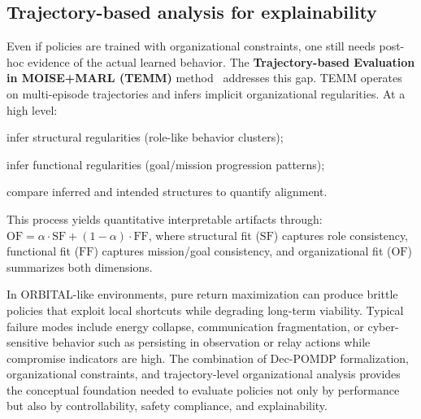 \documentclass[sigconf]{aamas}
\begin{document}
\subsection{Trajectory-based analysis for explainability}
Even if policies are trained with organizational constraints, one still needs post-hoc evidence of the actual learned behavior. The \textbf{Trajectory-based Evaluation in MOISE+MARL (TEMM)} method~\cite{soule2024moise_marl} addresses this gap.
%
TEMM operates on multi-episode trajectories and infers implicit organizational regularities. At a high level:
\begin{enumerate*}[label={\roman*) },itemjoin={; \quad}]
    \item infer structural regularities (role-like behavior clusters);
    \item infer functional regularities (goal/mission progression patterns);
    \item compare inferred and intended structures to quantify alignment.
\end{enumerate*}

This process yields quantitative interpretable artifacts through:
$\mathrm{OF}=\alpha \cdot \mathrm{SF} + (1-\alpha)\cdot \mathrm{FF}$,
where structural fit ($\mathrm{SF}$) captures role consistency, functional fit ($\mathrm{FF}$) captures mission/goal consistency, and organizational fit ($\mathrm{OF}$) summarizes both dimensions.

In ORBITAL-like environments, pure return maximization can produce brittle policies that exploit local shortcuts while degrading long-term viability. Typical failure modes include energy collapse, communication fragmentation, or cyber-sensitive behavior such as persisting in observation or relay actions while compromise indicators are high. The combination of Dec-POMDP formalization, organizational constraints, and trajectory-level organizational analysis provides the conceptual foundation needed to evaluate policies not only by performance but also by controllability, safety compliance, and explainability.
\end{document}
